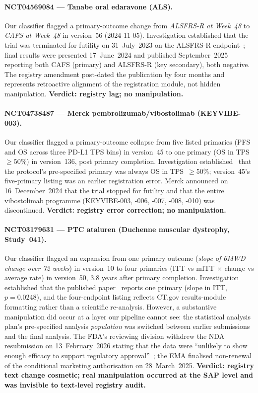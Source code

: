 \documentclass[11pt,a4paper]{article}
\begin{document}
\paragraph{NCT04569084 --- Tanabe oral edaravone (ALS).}
Our classifier flagged a primary-outcome change from
\emph{ALSFRS-R at Week~48} to \emph{CAFS at Week~48} in version~56
(2024-11-05). Investigation established that the trial was terminated
for futility on 31~July~2023 on the ALSFRS-R endpoint~\cite{tanabe_mt1186_2024};
final results were presented 17~June~2024 and published
September~2025~\cite{rothstein2025edaravone} reporting both CAFS
(primary) and ALSFRS-R (key secondary), both negative. The registry
amendment post-dated the publication by four months and represents
retroactive alignment of the registration module, not hidden
manipulation. \textbf{Verdict: registry lag; no manipulation.}

\paragraph{NCT04738487 --- Merck pembrolizumab/vibostolimab (KEYVIBE-003).}
Our classifier flagged a primary-outcome collapse from five listed
primaries (PFS and OS across three PD-L1 TPS bins) in version~45 to
one primary (OS in TPS~$\geq 50\%$) in version~136, post primary
completion. Investigation established~\cite{merck_keyvibe_2024}
that the protocol's pre-specified primary was always OS in TPS~$\geq
50\%$; version~45's five-primary listing was an earlier registration
error. Merck announced on 16~December~2024 that the trial stopped
for futility and that the entire vibostolimab programme
(KEYVIBE-003, -006, -007, -008, -010) was discontinued.
\textbf{Verdict: registry error correction; no manipulation.}

\paragraph{NCT03179631 --- PTC ataluren (Duchenne muscular dystrophy,
Study~041).}
Our classifier flagged an expansion from one primary outcome
(\emph{slope of 6MWD change over 72 weeks}) in version~10 to four
primaries (ITT vs mITT $\times$ change vs average rate) in version~50,
3.8 years after primary completion. Investigation established that
the published paper~\cite{ptc_muntoni_2025} reports one primary
(slope in ITT, $p=0.0248$), and the four-endpoint listing reflects
CT.gov results-module formatting rather than a scientific re-analysis.
However, a substantive manipulation did occur at a layer our pipeline
cannot see: the statistical analysis plan's pre-specified analysis
\emph{population} was switched between earlier submissions and the
final analysis. The FDA's reviewing division withdrew the NDA
resubmission on 13~February~2026 stating that the data were
``unlikely to show enough efficacy to support regulatory
approval''~\cite{ptc_withdrawal_2026}; the EMA finalised
non-renewal of the conditional marketing authorisation on
28~March~2025. \textbf{Verdict: registry text change cosmetic; real
manipulation occurred at the SAP level and was invisible to
text-level registry audit.}
\end{document}
